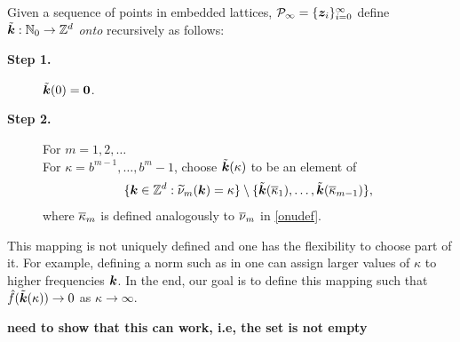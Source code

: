 \documentclass[graybox]{svmult}
\newcommand{\Z}{\mathbb{Z}} %
\newcommand{\N}{\mathbb{N}} %
\newcommand{\bszero}{\boldsymbol{0}} %
\newcommand{\bsz}{\boldsymbol{z}}    %
\begin{document}
\begin{definition} \label{wavenummapdef} Given a sequence of points in embedded lattices, $\cp_{\infty} = \{\bsz_i\}_{i=0}^{\infty}$ define $\tvk: \N_0 \to \Z^d$ \emph{onto} recursively as follows:
\begin{description}
\item[\textbf{Step 1.}] $\tvk(0)=\bszero$.

\item[\textbf{Step 2.}] For $m=1, 2, \ldots$ \\
\hspace*{1.3cm} For $\kappa = b^{m-1}, \ldots, b^{m} -1 $, choose $\tilde{\boldsymbol{k}}(\kappa)$ to be an element of
\[
\{\bsk \in  \Z^d : \tnu_{m}(\bsk)=\kappa \} \setminus \{\tvk(\okappa_1), \ldots, \tvk(\okappa_{m-1})\},
\]
\hspace*{1.3cm} where $\overline{\kappa}_{m}$ is defined analogously to $\overline{\nu}_{m}$ in \eqref{onudef}.
\end{description}
\end{definition}

This mapping is not uniquely defined and one has the flexibility to choose part of it. For example, defining a norm such as in \cite[Chap. 4]{SloJoe94} one can assign larger values of $\kappa$ to higher frequencies $\boldsymbol{k}$. In the end, our goal is to define this mapping such that $\hat{f}(\tilde{\boldsymbol{k}}(\kappa))\rightarrow 0$ as $\kappa \to \infty$.

{\bf need to show that this can work, i.e, the set is not empty} 
\end{document}
